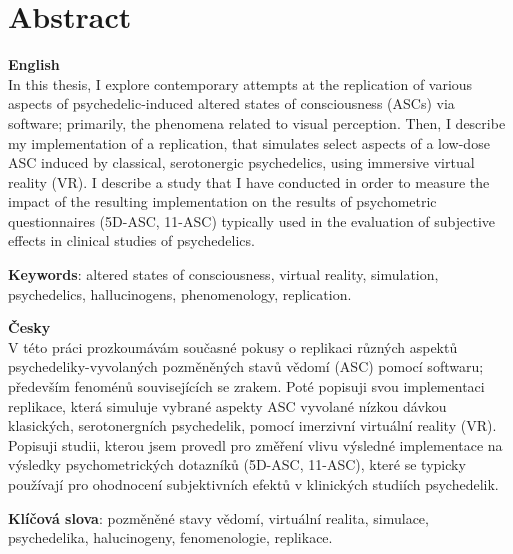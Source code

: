 \chapter*{Abstract}

{\Large\textbf{English}}\\
In this thesis, I explore contemporary attempts at the replication of various aspects of psychedelic-induced altered states of consciousness (ASCs) via software; primarily, the phenomena related to visual perception. Then, I describe my implementation of a replication, that simulates select aspects of a low-dose ASC induced by classical, serotonergic psychedelics, using immersive virtual reality (VR). I describe a study that I have conducted in order to measure the impact of the resulting implementation on the results of psychometric questionnaires (5D-ASC, 11-ASC) typically used in the evaluation of subjective effects in clinical studies of psychedelics.

\textbf{Keywords}: altered states of consciousness, virtual reality, simulation, psychedelics, hallucinogens, phenomenology, replication.

\vspace{0.5cm}
\noindent
{\Large\textbf{Česky}}\\
V této práci prozkoumávám současné pokusy o replikaci různých aspektů psychedeliky-vyvolaných pozměněných stavů vědomí (ASC) pomocí softwaru; především fenoménů souvisejících se zrakem. Poté popisuji svou implementaci replikace, která simuluje vybrané aspekty ASC vyvolané nízkou dávkou klasických, serotonergních psychedelik, pomocí imerzivní virtuální reality (VR). Popisuji studii, kterou jsem provedl pro změření vlivu výsledné implementace na výsledky psychometrických dotazníků (5D-ASC, 11-ASC), které se typicky používají pro ohodnocení subjektivních efektů v klinických studiích psychedelik.

\textbf{Klíčová slova}: pozměněné stavy vědomí, virtuální realita, simulace, psychedelika, halucinogeny, fenomenologie, replikace.

